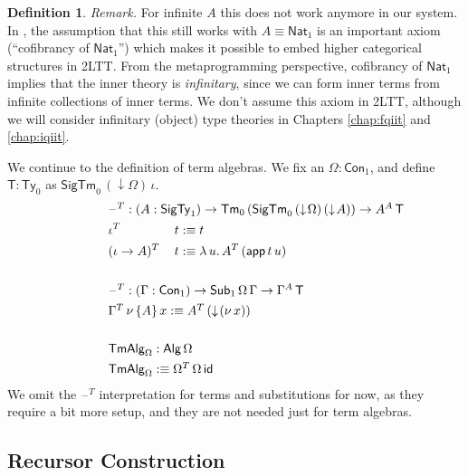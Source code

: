 \documentclass[12pt,a4paper,twoside,openany]{book}
\theoremstyle{remark}
\theoremstyle{definition}
\newtheorem{mydefinition}{Definition}
\theoremstyle{theorem}
\newcommand{\ms}[1]{\mathsf{#1}}
\newcommand{\id}{\mathsf{id}}
\newcommand{\Con}{\mathsf{Con}}
\newcommand{\Sub}{\mathsf{Sub}}
\newcommand{\Tm}{\mathsf{Tm}}
\newcommand{\Ty}{\mathsf{Ty}}
\newcommand{\blank}{\mathord{\hspace{1pt}\text{--}\hspace{1pt}}}
\newcommand{\SigTy}{\mathsf{SigTy}}
\newcommand{\SigTm}{\mathsf{SigTm}}
\newcommand{\app}{\ms{app}}
\newcommand{\Alg}{\ms{Alg}}
\newcommand{\TmAlg}{\ms{TmAlg}}
\newcommand{\Nat}{\ms{Nat}}
\newcommand{\down}{\downarrow}
\newcommand{\defn}{:\equiv}
\begin{document}
\begin{mydefinition}
\emph{Remark.} For infinite $A$ this does not work anymore in our system. In
\cite{twolevel}, the assumption that this still works with $A \equiv \Nat_1$ is
an important axiom (``cofibrancy of $\Nat_1$'') which makes it possible to embed
higher categorical structures in 2LTT. From the metaprogramming perspective,
cofibrancy of $\Nat_1$ implies that the inner theory is \emph{infinitary}, since
we can form inner terms from infinite collections of inner terms. We don't
assume this axiom in 2LTT, although we will consider infinitary (object) type
theories in Chapters \ref{chap:fqiit} and \ref{chap:iqiit}.
\end{mydefinition}

\noindent
We continue to the definition of term algebras. We fix an $\Omega : \Con_1$, and
define $\ms{T} : \Ty_0$ as $\SigTm_0\,(\down\!\Omega)\,\iota$.
\begingroup
\allowdisplaybreaks
\begin{alignat*}{3}
  & \hspace{-5em}\rlap{$\blank^T : (A : \SigTy_1) \to \Tm_0\,(\SigTm_0\,(\down\!\Omega)\,(\down\!A)) \to A^A\,\ms{T}$} \\
  & \hspace{-5em}\iota^T\,&&t \defn t \\
  & \hspace{-5em}(\iota\to A)^T\,&&t \defn \lambda\,u.\,A^T\,(\app\,t\,u)\\
  & \hspace{-5em}&&\\
  & \hspace{-5em}\rlap{$\blank^T : (\Gamma : \Con_1) \to \Sub_1\,\Omega\,\Gamma \to \Gamma^A\,\ms{T}$}\\
  & \hspace{-5em}\rlap{$\Gamma^T\,\nu\,\{A\}\,x \defn A^T\,(\down\!(\nu\,x))$}\\
  & \hspace{-5em} && \\
  & \hspace{-5em}\rlap{$\TmAlg_{\Omega} : \Alg\,\Omega$}\\
  & \hspace{-5em}\rlap{$\TmAlg_{\Omega} \defn \Omega^T\,\Omega\,\id$}
\end{alignat*}
\endgroup
We omit the $\blank^T$ interpretation for terms and substitutions for now, as
they require a bit more setup, and they are not needed just for term algebras.

\subsection{Recursor Construction}
\end{document}
